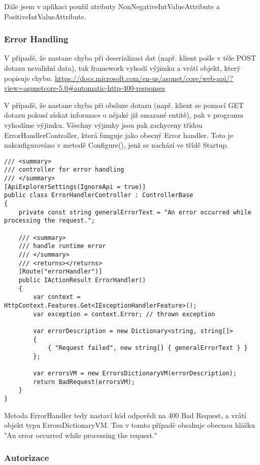 Dále jsem v aplikaci použil atributy NonNegativeIntValueAttribute a PositiveIntValueAttribute.


\subsubsection*{Error Handling}

V případě, že nastane chyba při deserializaci dat (např. klient pošle v těle POST dotazu nevalidní data), tak framework vyhodí výjimku a vrátí objekt, který popisuje chybu. \url{https://docs.microsoft.com/en-us/aspnet/core/web-api/?view=aspnetcore-5.0#automatic-http-400-responses}

V případě, že nastane chyba při obsluze dotazu (např. klient se pomocí GET dotazu pokusí získat informace o nějaké již smazané entitě), pak v programu vyhodíme výjimku. Všechny výjimky jsou pak zachyceny třídou ErrorHandlerController, která funguje jako obecný Error handler.
Toto je nakonfigurováno v metodě Configure(), jenž se nachází ve třídě Startup.
\begin{lstlisting}
/// <summary>
/// controller for error handling
/// </summary>
[ApiExplorerSettings(IgnoreApi = true)]
public class ErrorHandlerController : ControllerBase
{
	private const string generalErrorText = "An error occurred while processing the request.";
	
	/// <summary>
	/// handle runtime error
	/// </summary>
	/// <returns></returns>
	[Route("errorHandler")]
	public IActionResult ErrorHandler()
	{
		var context = HttpContext.Features.Get<IExceptionHandlerFeature>();
		var exception = context.Error; // thrown exception
		
		var errorDescription = new Dictionary<string, string[]>
		{
			{ "Request failed", new string[] { generalErrorText } }
		};
		
		var errorsVM = new ErrorsDictionaryVM(errorDescription);
		return BadRequest(errorsVM);
	}
}
\end{lstlisting}
Metoda ErrorHandler tedy nastaví kód odpovědi na 400 Bad Request, a vrátí objekt typu ErrorsDictionaryVM.
Ten v tomto případě obsahuje obecnou hlášku "An error occurred while processing the request."

\subsubsection*{Autorizace}

